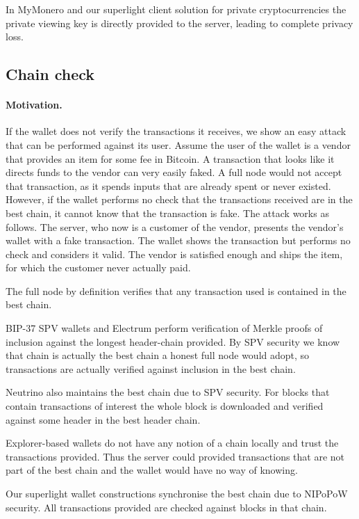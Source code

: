 In MyMonero and our superlight client solution for private cryptocurrencies the private viewing key is directly provided to the server, leading to complete privacy loss.

\subsection{Chain check}
\paragraph{Motivation.} If the wallet does not verify the transactions it receives, we show an easy attack that can be performed against its user. Assume the user of the wallet is a vendor that provides an item for some fee in Bitcoin. A transaction that looks like it directs funds to the vendor can very easily faked. A full node would not accept that transaction, as it spends inputs that are already spent or never existed. However, if the wallet performs no check that the transactions received are in the best chain, it cannot know that the transaction is fake. The attack works as follows. The server, who now is a customer of the vendor, presents the vendor's wallet with a fake transaction. The wallet shows the transaction but performs no check and considers it valid. The vendor is satisfied enough and ships the item, for which the customer never actually paid.

The full node by definition verifies that any transaction used is contained in the best chain.

BIP-37 SPV wallets and Electrum perform verification of Merkle proofs of inclusion against the longest header-chain provided. By SPV security we know that chain is actually the best chain a honest full node would adopt, so transactions are actually verified against inclusion in the best chain.

Neutrino also maintains the best chain due to SPV security. For blocks that contain transactions of interest the whole block is downloaded and verified against some header in the best header chain.

Explorer-based wallets do not have any notion of a chain locally and trust the transactions provided. Thus the server could provided transactions that are not part of the best chain and the wallet would have no way of knowing.

Our superlight wallet constructions synchronise the best chain due to NIPoPoW security. All transactions provided are checked against blocks in that chain.

